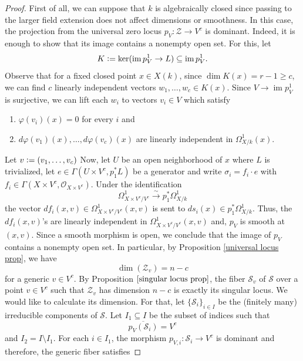 \documentclass[a4paper,12pt]{amsart}
\numberwithin{equation}{section}
\newcommand{\defeq}{\vcentcolon=}
\DeclareMathOperator{\im}{\operatorname{im}}
\renewcommand{\geq}{\geqslant}
\renewcommand{\_}{\rule{0.25cm}{0.4pt}}
\begin{document}
\begin{proof}
    First of all, we can suppose that $k$ is algebraically closed since passing to the larger field extension does not affect dimensions or smoothness. In this case, the projection from the universal zero locus $p_{V}\colon \mathcal{Z}\to V^{c}$ is dominant. Indeed, it is enough to show that its image contains a nonempty open set. For this, let
    \[
    K\defeq \ker(\im p^{1}_{V}\to L)\subseteq \im p^{1}_{V}.
    \]
    Observe that for a fixed closed point $x\in X(k)$, since $\dim K(x)=r-1\geq c$, we can find $c$ linearly independent vectors $w_{1},\dots, w_{c}\in K(x)$. Since $V\to \im p^{1}_{V}$ is surjective, we can lift each $w_{i}$ to vectors $v_{i}\in V$ which satisfy 
    \begin{enumerate}
        \item $\varphi(v_{i})(x)=0$ for every $i$ and
        \item $d\varphi(v_{1})(x),\dots, d\varphi(v_{c})(x)$ are linearly independent in $\Omega^{1}_{X/k}(x)$.
    \end{enumerate}
    Let $v\defeq (v_{1},\dots, v_{c})$ Now, let $U$ be an open neighborhood of $x$ where $L$ is trivialized, let $e\in \Gamma(U\times V^{c},p_{1}^{\ast}L)$ be a generator and write $\sigma_{i}=f_{i}\cdot e$ with $f_{i}\in \Gamma(X\times V^{c},\mathcal{O}_{X\times V^{c}})$. Under the identification
    \[
    \Omega^{1}_{X\times V^{c}/V^{c}}\xrightarrow{\sim} p_{1}^{\ast}\Omega^{1}_{X/k}
    \]
    the vector $df_{i}(x,v)\in \Omega^{1}_{X\times V^{c}/V^{c}}(x,v)$ is sent to $ds_{i}(x)\in p_{1}^{\ast}\Omega^{1}_{X/k}$. Thus, the $df_{i}(x,v)$'s are linearly independent in $\Omega^{1}_{X\times V^{c}/V^{c}}(x,v)$ and, $p_{V}$ is smooth at $(x,v)$. Since a smooth morphism is open, we conclude that the image of $p_{V}$ contains a nonempty open set. In particular, by Proposition \ref{universal locus prop}, we have 
    \[
    \dim(\mathcal{Z}_{v})=n-c
    \]
    for a generic $v\in V^{c}$. By Proposition $\ref{singular locus prop}$, the fiber $\mathcal{S}_{v}$ of $\mathcal{S}$ over a point $v\in V^{c}$ such that $\mathcal{Z}_{v}$ has dimension $n-c$ is exactly its singular locus. We would like to calculate its dimension. For that, let $\{\mathcal{S}_{i}\}_{i\in I}$ be the (finitely many) irreducible components of $\mathcal{S}$. Let $I_{1}\subseteq I$ be the subset of indices such that 
    \[
    \overline{p_{V}(\mathcal{S}_{i})}=V^{c}
    \]
    and $I_{2}=I\setminus I_{1}$. For each $i\in I_{1}$, the morphism $p_{V,i}\colon \mathcal{S}_{i}\to V^{c}$ is dominant and therefore, the generic fiber satisfies

\end{proof}
\end{document}
